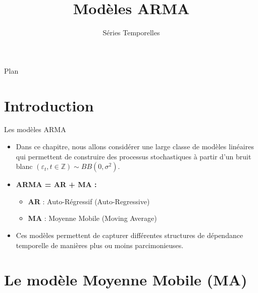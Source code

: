 \documentclass[11pt,aspectratio=169]{beamer}
\title{Modèles ARMA}
\subtitle{Séries Temporelles}
\author{}
\date{}
\institute{}
\newcommand{\Z}{\mathbb{Z}}
\begin{document}
\begin{frame}
\titlepage
\end{frame}

\begin{frame}{Plan}
\tableofcontents
\end{frame}

\section{Introduction}

\begin{frame}{Les modèles ARMA}

\begin{itemize}

\item Dans ce chapitre, nous allons considérer une large classe de modèles linéaires qui permettent de construire des processus stochastiques à partir d'un bruit blanc $(\varepsilon_t, t \in \Z) \sim BB(0, \sigma^2)$.\newline

\item \textbf{ARMA = AR + MA :}
\begin{itemize}
\item \textbf{AR} : Auto-Régressif (Auto-Regressive)
\item \textbf{MA} : Moyenne Mobile (Moving Average)
\end{itemize}

\item Ces modèles permettent de capturer différentes structures de dépendance temporelle de manières plus ou moins  parcimonieuses.

\end{itemize}
\end{frame}

\section{Le modèle Moyenne Mobile (MA)}
\end{document}
